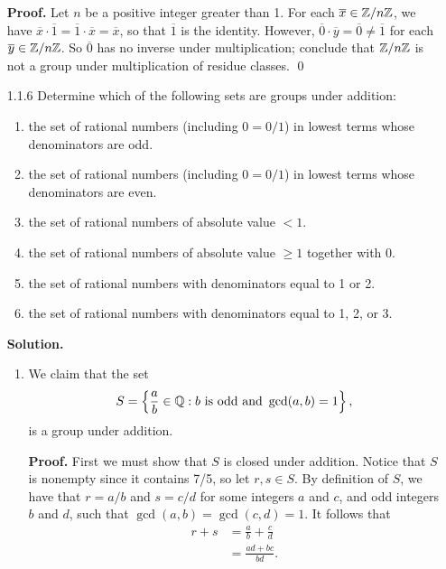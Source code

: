 \begin{enumerate}
      \textbf{Proof.} Let $n$ be a positive integer greater than 1. For each
      $\overline{x} \in \mathbb{Z}/n\mathbb{Z}$, we have
      $\overline{x} \cdot \overline{1} = \overline{1} \cdot \overline{x} =
      \overline{x}$, so that $\overline{1}$ is the identity. However,
      $\overline{0} \cdot \overline{y} = \overline{0} \neq \overline{1}$ for
      each $\overline{y} \in \mathbb{Z}/n\mathbb{Z}$. So $\overline{0}$ has no inverse under
      multiplication; conclude that $\mathbb{Z}/n\mathbb{Z}$ is not a group under
      multiplication of residue classes. \qed
   \item[1.1.6]   Determine which of the following sets are groups under
                  addition:
                  \begin{enumerate}
                     \item the set of rational numbers (including $0 = 0/1$) in
                           lowest terms whose denominators are odd.
                     \item the set of rational numbers (including $0 = 0/1$) in
                           lowest terms whose denominators are even.
                     \item the set of rational numbers of absolute value $< 1$.
                     \item the set of rational numbers of absolute value $\ge 1$
                           together with 0.
                     \item the set of rational numbers with denominators equal
                           to 1 or 2.
                     \item the set of rational numbers with denominators equal
                           to 1, 2, or 3.
                  \end{enumerate}

      \textbf{Solution.}

      \begin{enumerate}
         \item We claim that the set
               $$S = \left\{\frac{a}{b} \in \mathbb{Q} : b \text{ is odd} \text{ and }
                 \gcd(a, b) = 1\right\},$$
               is a group under addition.

               \textbf{Proof.} First we must show that $S$ is closed under 
               addition. Notice that $S$ is nonempty since it contains 7/5, so 
               let $r, s \in S$. By definition of $S$, we have that
               $r = a/b$ and $s = c/d$ for some integers $a$ and $c$, and odd 
               integers $b$ and $d$, such that
               $\gcd(a, b) = \gcd(c, d) = 1$. It follows that
               \begin{align*}
                  r + s &= \frac{a}{b} + \frac{c}{d} \\
                        &= \frac{ad + bc}{bd}.
               \end{align*}


\end{enumerate}
\end{enumerate}
